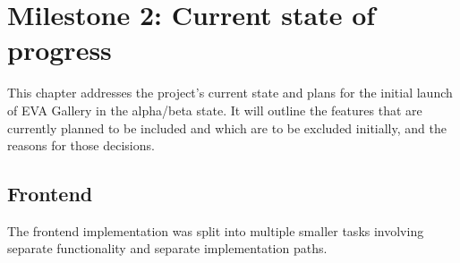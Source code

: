 



\chapter{Milestone 2: Current state of progress}
This chapter addresses the project's current state and plans for the initial launch of EVA Gallery in the alpha/beta state. It will outline the features that are currently planned to be included and which are to be excluded initially, and the reasons for those decisions.
\section{Frontend}
\noindent
The frontend implementation was split into multiple smaller tasks involving separate functionality and separate implementation paths.

